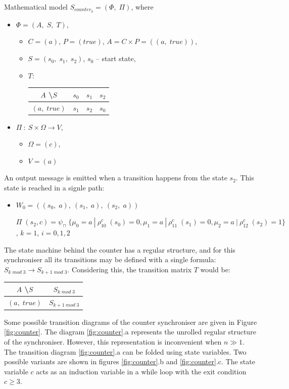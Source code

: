 \documentclass{article}
\begin{document}
\begin{enumerate}
Mathematical model $S_{counter_{3}} = (\Phi, \; \Pi)$, where
  \begin{itemize}
  \item[] $\Phi = (A, \; S, \; T)$,
    \begin{itemize}
    \item[] $C = (a)$, $P = (true)$, $A = C \times P = ((a, \; true))$,
    \item[] $S = (s_{0}, \; s_{1}, \; s_{2})$, $s_{0}$ -- start state,
    \item[] $T$:
      \begin{tabular}{c|c|c|c}
      $A$ \textbackslash $S$ & $s_{0}$ & $s_{1}$ & $s_{2}$\\
      \hline
      $(a, \; true)$ & $s_{1}$ & $s_{2}$ & $s_{0}$\\
      \end{tabular}
    \end{itemize}
  \item[] $\Pi \: : \: S \times \Omega \to V$,
    \begin{itemize}
    \item[] $\Omega = (c)$,
    \item[] $V = (a)$
    \end{itemize}
  \end{itemize}

An output message is emitted when a transition happens from the state $s_{2}$. This state is reached in a signle path:
  \begin{itemize}
  \item[]
$W_{0} = ((s_{0}, \; a), \: (s_{1}, \; a), \: (s_{2}, \; a))$

$\Pi \; (s_{2}, c) = \psi_{\sqcap} \; \{\mu_{0} = a \: | \: \rho_{10}^{c} \; (s_{0}) = 0, \mu_{1} = a \: | \: \rho_{11}^{c} \; (s_{1}) = 0, \mu_{2} = a \: | \: \rho_{12}^{c} \; (s_{2}) = 1\}$, $k = 1$, $i = 0,1,2$ 
  \end{itemize}

The state machine behind the counter has a regular structure, and for this synchroniser all its transitions may be defined with a single formula: $S_{k \; mod \; 3} \to S_{k+1 \; mod \; 3}$. Considering this, the transition matrix $T$ would be:
  \begin{tabular}{c|c}
  $A$ \textbackslash $S$ & $S_{k \; mod \; 3}$\\
  \hline
  $(a, \; true)$ & $S_{k+1 \; mod \; 3}$
  \end{tabular}

Some possible transition diagrams of the counter synchroniser are given in Figure \ref{fig:counter}. The diagram \ref{fig:counter}.a represents the unrolled regular structure of the synchroniser. However, this representation is inconvenient when $n \gg 1$. The transition diagram \ref{fig:counter}.a can be folded using state variables. Two possible variants are shown in figures \ref{fig:counter}.b and \ref{fig:counter}.c. The state variable $c$ acts as an induction variable in a while loop with the exit condition $c \ge 3$.


\end{enumerate}
\end{document}
